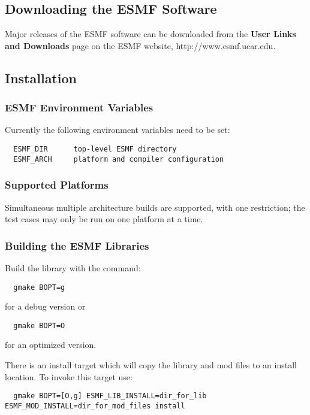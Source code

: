 
\subsection{Downloading the ESMF Software}

Major releases of the ESMF software can be downloaded from the {\bf User Links and
Downloads} page on the ESMF website, 
{http://www.esmf.ucar.edu}.  

\subsection{Installation}
\label{InstallProcedures}

\subsubsection{ESMF Environment Variables}

Currently the following environment variables need to be set:
\begin{verbatim}
  ESMF_DIR      top-level ESMF directory
  ESMF_ARCH     platform and compiler configuration
\end{verbatim}


\subsubsection{Supported Platforms}




Simultaneous multiple architecture builds are supported, with
one restriction; the test cases may only be run on one platform at a time. 

\subsubsection{Building the ESMF Libraries}
\label{BuildESMF}

Build the library with the command:
\begin{verbatim}
  gmake BOPT=g  
\end{verbatim}
  for a debug version or
\begin{verbatim}
  gmake BOPT=O  
\end{verbatim}
  for an optimized version.

There is an install target which will copy the library and mod files to an
install location.  To invoke this target use:
\begin{verbatim}
  gmake BOPT=[O,g] ESMF_LIB_INSTALL=dir_for_lib ESMF_MOD_INSTALL=dir_for_mod_files install 
\end{verbatim}

